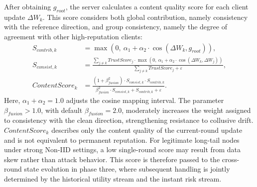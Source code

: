 \documentclass[11pt, a4paper]{article}
\begin{document}
After obtaining $g_{root}$, the server calculates a content quality score for each client update $\Delta W_k$. This score considers both global contribution, namely consistency with the reference direction, and group consistency, namely the degree of agreement with other high-reputation clients:
\begin{align}
    S_{contrib,k}    & = \max\left(0,\ \alpha_{1} + \alpha_{2} \cdot \cos(\Delta W_{k}, g_{root})\right),                                                                                             \\
    S_{consist,k}    & = \frac{\sum_{j\neq k} TrustScore_{j} \cdot \max\left(0,\ \alpha_{1} + \alpha_{2} \cdot \cos(\Delta W_{k}, \Delta W_{j})\right)}{\sum_{j\neq k} TrustScore_{j} + \varepsilon}, \\
    ContentScore_{k} & = \frac{(1 + \beta_{fusion}^{2}) \cdot S_{consist,k} \cdot S_{contrib,k}}{\beta_{fusion}^{2}\cdot S_{consist,k} + S_{contrib,k} + \varepsilon}.
\end{align}
Here, $\alpha_1+\alpha_2=1.0$ adjusts the cosine mapping interval. The parameter $\beta_{fusion}>1.0$, with default $\beta_{fusion}=2.0$, moderately increases the weight assigned to consistency with the clean direction, strengthening resistance to collusive drift. $ContentScore_k$ describes only the content quality of the current-round update and is not equivalent to permanent reputation. For legitimate long-tail nodes under strong Non-IID settings, a low single-round score may result from data skew rather than attack behavior. This score is therefore passed to the cross-round state evolution in phase three, where subsequent handling is jointly determined by the historical utility stream and the instant risk stream.
\end{document}
